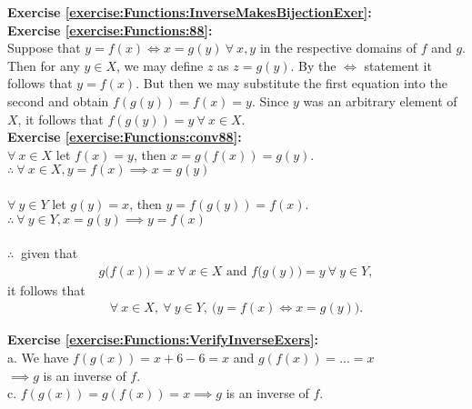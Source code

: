 \noindent\textbf{Exercise \ref{exercise:Functions:InverseMakesBijectionExer}:}\\

\noindent\textbf{Exercise \ref{exercise:Functions:88}:}\\ %
Suppose that  $y = f(x)\Leftrightarrow x = g(y)\ \forall\ x,y$ in the respective domains of $f$ and $g$. Then for any $y\in X$, we may define $z$ as $z = g(y)$. By the $\Leftrightarrow$ statement it follows that $y = f(x)$. But then we may substitute the first equation into the second and obtain $f(g(y)) = f(x) = y$. Since $y$ was an arbitrary element of $X$, it follows that $f(g(y)) = y\ \forall\ x\in X$.\\

\noindent\textbf{Exercise \ref{exercise:Functions:conv88}:}\\ %
$\forall\ x\in X$ let $f(x) = y$, then $x = g(f(x)) = g(y)$.\\
$\therefore\ \forall\ x\in X, y = f(x) \implies x = g(y)$\\
\\  
$\forall\ y\in Y$ let $g(y) = x$, then $y = f(g(y)) = f(x)$.\\
$\therefore\ \forall\ y\in Y, x = g(y) \implies y = f(x)$\\
\\   
$\therefore\ $ given that
\begin{align*}
g\bigl(f(x) \bigr) = x\ \forall\ x \in X \text{\ and\ } f\bigl(g(y)\bigr) = y\ \forall\ y\in Y,
\end{align*}
it follows that
\begin{align*} 
\forall\ x\in X,\ \forall\ y\in Y,\ \bigl(y=f(x) \Leftrightarrow x = g(y)\bigr).
\end{align*} 

\noindent\textbf{Exercise \ref{exercise:Functions:VerifyInverseExers}:}\\
a. We have $f(g(x))=x+6-6=x$ and $g(f(x))=...=x$\\
$\implies g$ is an inverse of $f$.\\
c. $f(g(x))=g(f(x))=x \implies g$ is an inverse of $f$.\\

